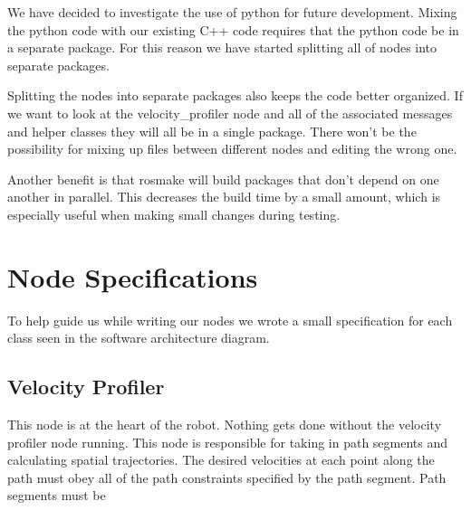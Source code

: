We have decided to investigate the use of python for future
development.  Mixing the python code with our existing C++ code
requires that the python code be in a separate package.  For this
reason we have started splitting all of nodes into separate packages.

Splitting the nodes into separate packages also keeps the code better
organized.  If we want to look at the velocity\_profiler node and all
of the associated messages and helper classes they will all be in a
single package.  There won't be the possibility for mixing up files
between different nodes and editing the wrong one.

Another benefit is that rosmake will build packages that don't depend
on one another in parallel.  This decreases the build time by a small
amount, which is especially useful when making small changes during testing.

\section{Node Specifications}

To help guide us while writing our nodes we wrote a small
specification for each class seen in the software architecture diagram.

\subsection{Velocity Profiler}
This node is at the heart of the robot.  Nothing gets done without the
velocity profiler node running.  This node is responsible for taking
in path segments and calculating spatial trajectories.  The desired
velocities at each point along the path must obey all of the path
constraints specified by the path segment.  Path segments must be

